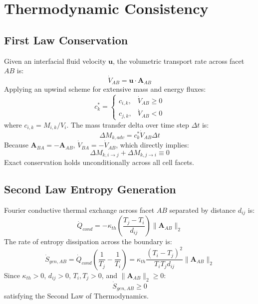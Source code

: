 \documentclass[10pt,journal,compsoc]{IEEEtran}
\begin{document}
\section{Thermodynamic Consistency}

\subsection{First Law Conservation}
Given an interfacial fluid velocity $\mathbf{u}$, the volumetric transport rate across facet $AB$ is:
\begin{equation}
\dot{V}_{AB} = \mathbf{u} \cdot \mathbf{A}_{AB}
\end{equation}
Applying an upwind scheme for extensive mass and energy fluxes:
\begin{equation}
c_k^* = \begin{cases} c_{i, k}, & \dot{V}_{AB} \ge 0 \\ c_{j, k}, & \dot{V}_{AB} < 0 \end{cases}
\end{equation}
where $c_{i, k} = M_{i, k} / V_i$. The mass transfer delta over time step $\Delta t$ is:
\begin{equation}
\Delta M_{k, adv} = c_k^* \dot{V}_{AB} \Delta t
\end{equation}
Because $\mathbf{A}_{BA} = -\mathbf{A}_{AB}$, $\dot{V}_{BA} = -\dot{V}_{AB}$, which directly implies:
\begin{equation}
\Delta M_{k, i \to j} + \Delta M_{k, j \to i} \equiv 0
\end{equation}
Exact conservation holds unconditionally across all cell facets.

\subsection{Second Law Entropy Generation}
Fourier conductive thermal exchange across facet $AB$ separated by distance $d_{ij}$ is:
\begin{equation}
\dot{Q}_{cond} = -\kappa_{th} \left(\frac{T_j - T_i}{d_{ij}}\right) \|\mathbf{A}_{AB}\|_2
\end{equation}
The rate of entropy dissipation across the boundary is:
\begin{equation}
\dot{S}_{gen, AB} = \dot{Q}_{cond} \left(\frac{1}{T_j} - \frac{1}{T_i}\right) = \kappa_{th} \frac{(T_i - T_j)^2}{T_i T_j d_{ij}} \|\mathbf{A}_{AB}\|_2
\end{equation}
Since $\kappa_{th} > 0$, $d_{ij} > 0$, $T_i, T_j > 0$, and $\|\mathbf{A}_{AB}\|_2 \ge 0$:
\begin{equation}
\dot{S}_{gen, AB} \ge 0
\end{equation}
satisfying the Second Law of Thermodynamics.
\end{document}
